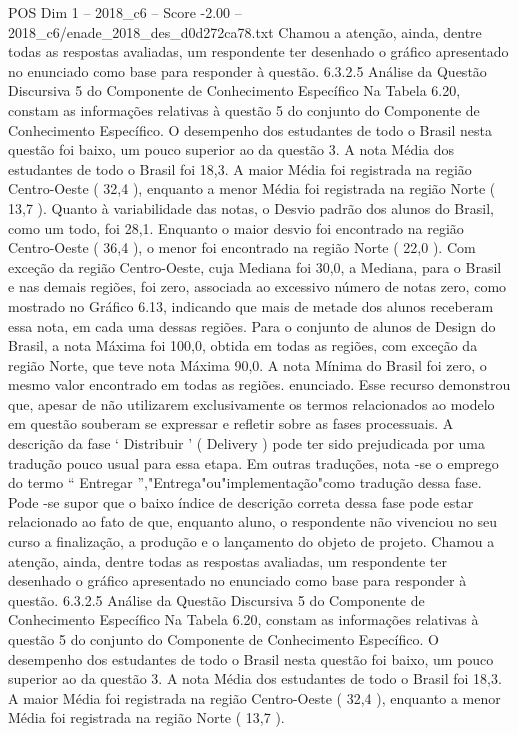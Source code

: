 \begin{textsample}{POS Dim 1 – 2018\_c6 – Score -2.00 – 2018\_c6/enade\_2018\_des\_d0d272ca78.txt}
Chamou a atenção, ainda, dentre todas as respostas avaliadas, um respondente ter desenhado o gráfico apresentado no enunciado como base para responder à questão. 6.3.2.5 Análise da Questão Discursiva 5 do Componente de Conhecimento Específico Na Tabela 6.20, constam as informações relativas à questão 5 do conjunto do Componente de Conhecimento Específico.
O desempenho dos estudantes de todo o Brasil nesta questão foi baixo, um pouco superior ao da questão 3.
A nota Média dos estudantes de todo o Brasil foi 18,3.
A maior Média foi registrada na região Centro-Oeste ( 32,4 ), enquanto a menor Média foi registrada na região Norte ( 13,7 ).
Quanto à variabilidade das notas, o Desvio padrão dos alunos do Brasil, como um todo, foi 28,1.
Enquanto o maior desvio foi encontrado na região Centro-Oeste ( 36,4 ), o menor foi encontrado na região Norte ( 22,0 ).
Com exceção da região Centro-Oeste, cuja Mediana foi 30,0, a Mediana, para o Brasil e nas demais regiões, foi zero, associada ao excessivo número de notas zero, como mostrado no Gráfico 6.13, indicando que mais de metade dos alunos receberam essa nota, em cada uma dessas regiões.
Para o conjunto de alunos de Design do Brasil, a nota Máxima foi 100,0, obtida em todas as regiões, com exceção da região Norte, que teve nota Máxima 90,0.
A nota Mínima do Brasil foi zero, o mesmo valor encontrado em todas as regiões. enunciado.
Esse recurso demonstrou que, apesar de não utilizarem exclusivamente os termos relacionados ao modelo em questão souberam se expressar e refletir sobre as fases processuais.
A descrição da fase ‘ Distribuir ’ ( Delivery ) pode ter sido prejudicada por uma tradução pouco usual para essa etapa.
Em outras traduções, nota -se o emprego do termo “ Entregar ”,"Entrega"ou"implementação"como tradução dessa fase.
Pode -se supor que o baixo índice de descrição correta dessa fase pode estar relacionado ao fato de que, enquanto aluno, o respondente não vivenciou no seu curso a finalização, a produção e o lançamento do objeto de projeto.
Chamou a atenção, ainda, dentre todas as respostas avaliadas, um respondente ter desenhado o gráfico apresentado no enunciado como base para responder à questão. 6.3.2.5 Análise da Questão Discursiva 5 do Componente de Conhecimento Específico Na Tabela 6.20, constam as informações relativas à questão 5 do conjunto do Componente de Conhecimento Específico.
O desempenho dos estudantes de todo o Brasil nesta questão foi baixo, um pouco superior ao da questão 3.
A nota Média dos estudantes de todo o Brasil foi 18,3.
A maior Média foi registrada na região Centro-Oeste ( 32,4 ), enquanto a menor Média foi registrada na região Norte ( 13,7 ).

\end{textsample}
